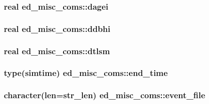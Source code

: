 \subsubsection[{dagei}]{\setlength{\rightskip}{0pt plus 5cm}real ed\+\_\+misc\+\_\+coms\+::dagei}\label{namespaceed__misc__coms_a6dedccb6bd1fa55c04ad14eee4ddb95e}
\hypertarget{namespaceed__misc__coms_addd21c151c013090994c5471206d6595}{}
\subsubsection[{ddbhi}]{\setlength{\rightskip}{0pt plus 5cm}real ed\+\_\+misc\+\_\+coms\+::ddbhi}\label{namespaceed__misc__coms_addd21c151c013090994c5471206d6595}
\hypertarget{namespaceed__misc__coms_ae6a9bf60ef97f576201d615634834480}{}
\subsubsection[{dtlsm}]{\setlength{\rightskip}{0pt plus 5cm}real ed\+\_\+misc\+\_\+coms\+::dtlsm}\label{namespaceed__misc__coms_ae6a9bf60ef97f576201d615634834480}
\hypertarget{namespaceed__misc__coms_a6b19c4e99a003ac8f1dbda410dd35599}{}
\subsubsection[{end\+\_\+time}]{\setlength{\rightskip}{0pt plus 5cm}type({\bf simtime}) ed\+\_\+misc\+\_\+coms\+::end\+\_\+time}\label{namespaceed__misc__coms_a6b19c4e99a003ac8f1dbda410dd35599}
\hypertarget{namespaceed__misc__coms_ab72c19aca546884ef6b4a1b38aa52500}{}
\subsubsection[{event\+\_\+file}]{\setlength{\rightskip}{0pt plus 5cm}character(len=str\+\_\+len) ed\+\_\+misc\+\_\+coms\+::event\+\_\+file}\label{namespaceed__misc__coms_ab72c19aca546884ef6b4a1b38aa52500}
\hypertarget{namespaceed__misc__coms_a0ce8ecbb164c2b948efa6fca900dd9d0}{}
